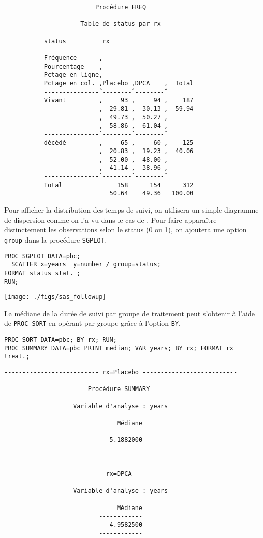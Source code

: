 \begin{verbatim}
                         Procédure FREQ

                     Table de status par rx

           status          rx

           Fréquence      ‚
           Pourcentage    ‚
           Pctage en ligne‚
           Pctage en col. ‚Placebo ‚DPCA    ‚  Total
           ---------------ˆ--------ˆ--------ˆ
           Vivant         ‚     93 ‚     94 ‚    187
                          ‚  29.81 ‚  30.13 ‚  59.94
                          ‚  49.73 ‚  50.27 ‚
                          ‚  58.86 ‚  61.04 ‚
           ---------------ˆ--------ˆ--------ˆ
           décédé         ‚     65 ‚     60 ‚    125
                          ‚  20.83 ‚  19.23 ‚  40.06
                          ‚  52.00 ‚  48.00 ‚
                          ‚  41.14 ‚  38.96 ‚
           ---------------ˆ--------ˆ--------ˆ
           Total               158      154      312
                             50.64    49.36   100.00
\end{verbatim}

Pour afficher la distribution des temps de suivi, on utilisera un simple
diagramme de dispersion comme on l'a vu dans le cas de \R. Pour faire
apparaître distinctement les observations selon le status (0 ou 1), on
ajoutera une option \texttt{group} dans la procédure \texttt{SGPLOT}.
\begin{verbatim}
PROC SGPLOT DATA=pbc;
  SCATTER x=years  y=number / group=status;
FORMAT status stat. ;
RUN;
\end{verbatim}

\texttt{[image: ./figs/sas\_followup]}

La médiane de la durée de suivi par groupe de traitement peut s'obtenir à
l'aide de \texttt{PROC SORT} en opérant par groupe grâce à l'option
\texttt{BY}.
\begin{verbatim}
PROC SORT DATA=pbc; BY rx; RUN;
PROC SUMMARY DATA=pbc PRINT median; VAR years; BY rx; FORMAT rx treat.;
\end{verbatim}

\begin{verbatim}
-------------------------- rx=Placebo --------------------------

                       Procédure SUMMARY

                   Variable d'analyse : years

                               Médiane
                          ------------
                             5.1882000
                          ------------


--------------------------- rx=DPCA ----------------------------

                   Variable d'analyse : years

                               Médiane
                          ------------
                             4.9582500
                          ------------
\end{verbatim}

